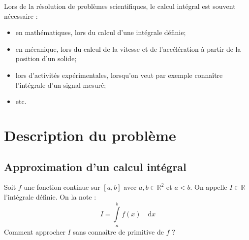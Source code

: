 \documentclass[10pt,fleqn]{article} %
\begin{document}





Lors de la résolution de problèmes scientifiques, le calcul intégral est souvent nécessaire :
\begin{itemize}
\item en mathématiques, lors du calcul d'une intégrale définie;
\item en mécanique, lors du calcul de la vitesse et de l'accélération à partir de la position d'un solide;
\item lors d'activités expérimentales, lorsqu'on veut par exemple connaître l'intégrale d'un signal mesuré;
\item etc.
\end{itemize}



\section{Description du problème}
\subsection{Approximation d'un calcul intégral}


Soit $f$ une fonction continue sur $[a,b]$ avec $a,b \in \mathbb{R}^2$ et $a<b$. On appelle $I\in\mathbb{R}$ l'intégrale définie. On la note :
$$
I = \int\limits_{a}^b f(x) \quad \mathrm{d} x
$$
Comment approcher $I$ sans connaître de primitive de $f$ ?
\end{document}
